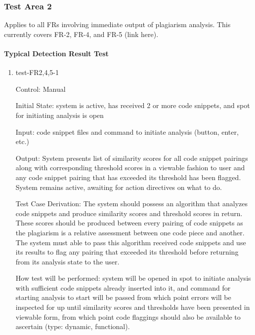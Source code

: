 \documentclass[12pt, titlepage]{article}
\begin{document}
\subsubsection{Test Area 2}

Applies to all FRs involving immediate output of plagiarism analysis. This 
currently covers FR-2, FR-4, and FR-5 (link here).

\paragraph{Typical Detection Result Test}

\begin{enumerate}

\item{test-FR2,4,5-1\\}

Control: Manual
					
Initial State: system is active, has received 2 or more code snippets, and 
spot for initiating analysis is open
					
Input: code snippet files and command to initiate analysis (button, enter, 
etc.) 
					
Output: System presents list of similarity scores for all code snippet pairings along 
with corresponding threshold scores in a viewable fashion to user and any code snippet
pairing that has exceeded its threshold has been flagged. System remains active, 
awaiting for action directives on what to do.

Test Case Derivation: The system should possess an algorithm that analyzes code 
snippets and produce similarity scores and threshold scores in return. These 
scores should be produced between every pairing of code snippets as the 
plagiarism is a relative assessment between one code piece and another. The 
system must able to pass this algorithm received code snippets and use its
results to flag any pairing that exceeded its threshold before returning from
its analysis state to the user.

How test will be performed: system will be opened in spot to initiate analysis 
with sufficient code snippets already inserted into it, and command for 
starting analysis to start will be passed from which point errors will be 
inspected for up until similarity scores and thresholds have been presented in 
viewable form, from which point code flaggings should also be available to 
ascertain (type: dynamic, functional).
					

\end{enumerate}
\end{document}
